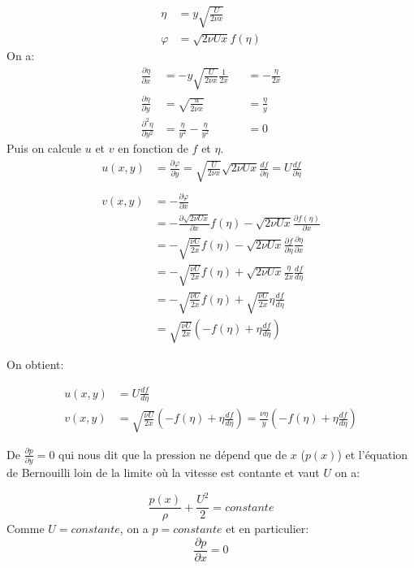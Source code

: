\documentclass[french]{article}
\begin{document}
\begin{align*}
	\eta &= y \sqrt{\frac{U}{2\nu x }} \\
	\varphi &= \sqrt{2\nu U x} f(\eta)
\end{align*}
On a:
\begin{align*}
	\frac{\partial \eta}{\partial x} &= 
		-y\sqrt{\frac{U}{2\nu x}}\frac{1}{2x} &&= 
		-\frac{\eta}{2x}\\
		\frac{\partial \eta}{\partial y} &=
		\sqrt{\frac{u}{2\nu x }} &&= \frac{\eta}{y}\\
		\frac{\partial^{2} \eta}{\partial y^{2}} &= 
		\frac{\eta}{y^{2}} - \frac{\eta}{y^{2}} &&= 0
\end{align*}
Puis on calcule $u$ et $v$ en fonction de $f$ et $\eta$.
\begin{align*}
	u(x,y) &= 
	\frac{\partial \varphi}{\partial y} 
	=
	\sqrt{\frac{U}{2\nu x }} \sqrt{2\nu U x}\frac{d f}{\partial \eta}
	= U \frac{d f}{\partial \eta}\\
	\\
	v(x,y) &= 
	- \frac{\partial \varphi}{\partial x} \\
	&=
	-\frac{\partial \sqrt{2\nu U x}} {\partial x}
	f(\eta) -
	\sqrt{2\nu Ux }
	\frac{\partial f(\eta)}{\partial x}\\
	&= 
	-\sqrt{\frac{\nu U}{2x}}
	f(\eta) -
	\sqrt{2\nu Ux }
	\frac{\partial f}{\partial \eta}
	\frac{\partial \eta}{\partial x}\\
	&=
	-\sqrt{\frac{\nu U}{2x}}
	f(\eta) +
	\sqrt{2\nu Ux}\frac{\eta}{2x}\frac{d f}{d \eta}
	\\
	&=
	-\sqrt{\frac{\nu U}{2x}}
	f(\eta) +
	\sqrt{\frac{\nu U}{2x}}\eta\frac{d f}{d \eta}
	\\
	&=
	\sqrt{\frac{\nu U}{2x}}
	\left(
	-f(\eta) + \eta\frac{d f}{d \eta}
	\right)
\end{align*}

On obtient:

\begin{align}
	u(x,y) &= 
	 U \frac{d f}{d \eta}\\
	v(x,y) &= 
	\sqrt{\frac{\nu U}{2x}}
	\left(
	-f(\eta) + \eta\frac{d f}{d \eta}
	\right) = 
	\frac{\nu\eta}{y}
	\left(
	-f(\eta) + \eta\frac{d f}{d \eta}
	\right)
\end{align}

De $\frac{\partial p}{\partial y} = 0$ qui nous dit que la pression ne dépend que de $x$ ($p(x)$) et l'équation de Bernouilli loin de la limite où la vitesse est contante et vaut $U$ on a:


\begin{equation*}
	\frac{p(x)}{\rho} + \frac{U^2}{2} = constante
\end{equation*}
Comme $U = constante$, on a $p = constante$ et en particulier:
\begin{equation}
	\frac{\partial p}{\partial x}  = 0
\end{equation}
\end{document}
